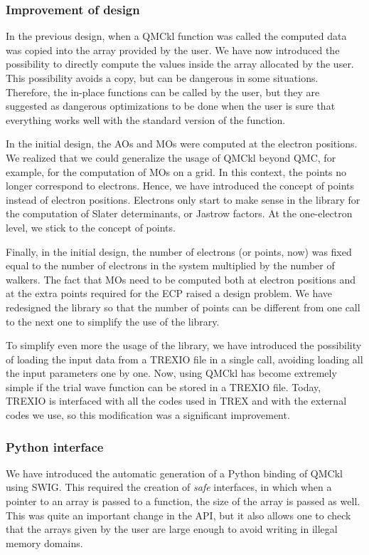 \subsubsection{Improvement of design}

In the previous design, when a QMCkl function was called the computed
data was copied into the array provided by the user. We have now
introduced the possibility to directly compute the values inside the
array allocated by the user. This possibility avoids a copy, but
can be dangerous in some situations. Therefore, the in-place functions
can be called by the user, but they are suggested as dangerous
optimizations to be done when the user is sure that everything works
well with the standard version of the function.

In the initial design, the \acp{AO} and \acp{MO} were computed at the
electron positions. We realized that we could generalize the
usage of QMCkl beyond QMC, for example, for the computation of \acp{MO} on a grid.
In this context, the points no longer correspond to electrons.
Hence, we have introduced the concept of points instead of electron
positions. Electrons only start to make sense in the library for the
computation of Slater determinants, or Jastrow factors. At the
one-electron level, we stick to the concept of points.

Finally, in the initial design, the number of electrons (or points,
now) was fixed equal to the number of electrons in the system
multiplied by the number of walkers. The fact that \acp{MO} need to be
computed both at electron positions and at the extra points required
for the \ac{ECP} raised a design problem. We have redesigned
the library so that the number of points can be different from one
call to the next one to simplify the use of the library.

To simplify even more the usage of the library, we have introduced the
possibility of loading the input data from a TREXIO file in a single
call, avoiding loading all the input parameters one by one. Now, using
QMCkl has become extremely simple if the trial wave function can be
stored in a TREXIO file. Today, TREXIO is interfaced with all the
codes used in TREX and with the external codes we use, so this
modification was a significant improvement.

\subsubsection{Python interface}

We have introduced the automatic generation of a Python binding of
QMCkl using SWIG. This required the creation of \emph{safe} interfaces,
in which when a pointer to an array is passed to a function, the size
of the array is passed as well. This was quite an important change in
the API, but it also allows one to check that the arrays given by the user
are large enough to avoid writing in illegal memory domains.

